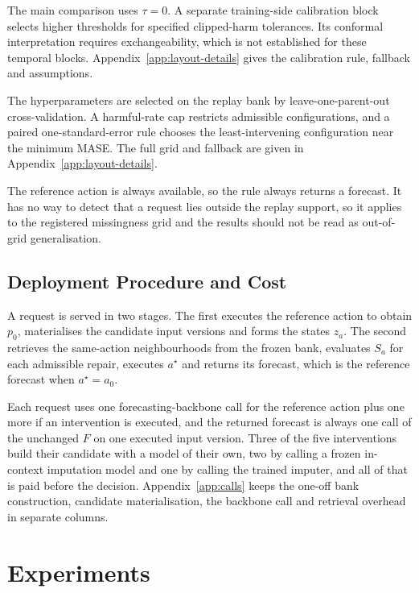 \documentclass{article}
\begin{document}
The main comparison uses $\tau=0$. A separate training-side calibration block selects
higher thresholds for specified clipped-harm tolerances. Its conformal interpretation
requires exchangeability, which is not established for these temporal blocks.
Appendix~\ref{app:layout-details} gives the calibration rule, fallback and assumptions.

The hyperparameters are selected on the replay bank by leave-one-parent-out cross-validation.
A harmful-rate cap restricts admissible configurations, and a paired one-standard-error rule
chooses the least-intervening configuration near the minimum MASE. The full grid and fallback
are given in Appendix~\ref{app:layout-details}.

The reference action is always available, so the rule always returns a forecast. It has no way
to detect that a request lies outside the replay support, so it applies to the registered
missingness grid and the results should not be read as out-of-grid generalisation.

\subsection{Deployment Procedure and Cost}
\label{sec:method-deploy}
A request is served in two stages. The first executes the reference action to obtain $p_0$,
materialises the candidate input versions and forms the states $z_a$. The second retrieves the
same-action neighbourhoods from the frozen bank, evaluates $S_a$ for each admissible repair,
executes $a^{\star}$ and returns its forecast, which is the reference forecast when
$a^{\star} = a_0$.

Each request uses one forecasting-backbone call for the reference action plus one more if an
intervention is executed, and the returned forecast is always one call of the unchanged $F$ on
one executed input version. Three of the five interventions build their candidate with a model
of their own, two by calling a frozen in-context imputation model and one by calling the
trained imputer, and all of that is paid before the decision.
Appendix~\ref{app:calls} keeps the one-off bank construction, candidate materialisation, the
backbone call and retrieval overhead in separate columns.

\section{Experiments}
\label{sec:exp}
\end{document}
